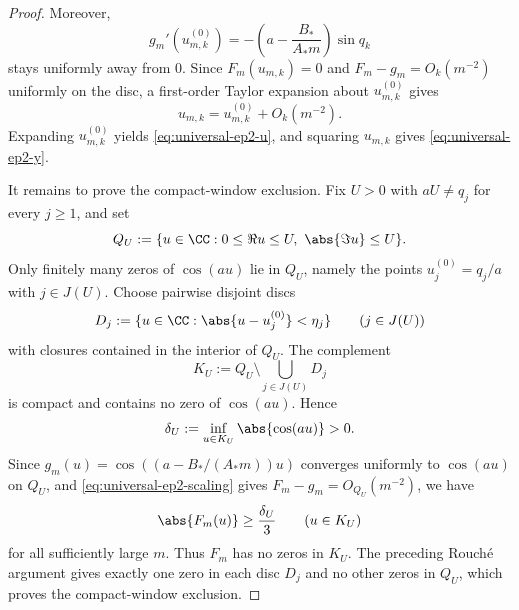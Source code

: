 \begin{proof}
Moreover,
\[
g_m'(u_{m,k}^{(0)})
=
-\left(a-\frac{B_*}{A_*m}\right)\sin q_k
\]
stays uniformly away from \(0\).
Since \(F_m(u_{m,k})=0\) and \(F_m-g_m=O_k(m^{-2})\) uniformly on the disc, a first-order Taylor expansion about \(u_{m,k}^{(0)}\) gives
\[
u_{m,k}=u_{m,k}^{(0)}+O_k(m^{-2}).
\]
Expanding \(u_{m,k}^{(0)}\) yields \eqref{eq:universal-ep2-u}, and squaring \(u_{m,k}\) gives \eqref{eq:universal-ep2-y}.

It remains to prove the compact-window exclusion.
Fix \(U>0\) with \(aU\neq q_j\) for every \(j\ge1\), and set
\[
Q_U:=\{u\in\CC:0\le \Re u\le U,\ \abs{\Im u}\le U\}.
\]
Only finitely many zeros of \(\cos(au)\) lie in \(Q_U\), namely the points \(u_j^{(0)}=q_j/a\) with \(j\in J(U)\).
Choose pairwise disjoint discs
\[
D_j:=\{u\in\CC:\abs{u-u_j^{(0)}}<\eta_j\}
\qquad (j\in J(U))
\]
with closures contained in the interior of \(Q_U\).
The complement
\[
K_U:=Q_U\setminus\bigcup_{j\in J(U)}D_j
\]
is compact and contains no zero of \(\cos(au)\).
Hence
\[
\delta_U:=\inf_{u\in K_U}\abs{\cos(au)}>0.
\]
Since \(g_m(u)=\cos((a-B_*/(A_*m))u)\) converges uniformly to \(\cos(au)\) on \(Q_U\), and \eqref{eq:universal-ep2-scaling} gives \(F_m-g_m=O_{Q_U}(m^{-2})\), we have
\[
\abs{F_m(u)}\ge \frac{\delta_U}{3}
\qquad (u\in K_U)
\]
for all sufficiently large \(m\).
Thus \(F_m\) has no zeros in \(K_U\).
The preceding Rouch\'e argument gives exactly one zero in each disc \(D_j\) and no other zeros in \(Q_U\), which proves the compact-window exclusion.
\end{proof}

